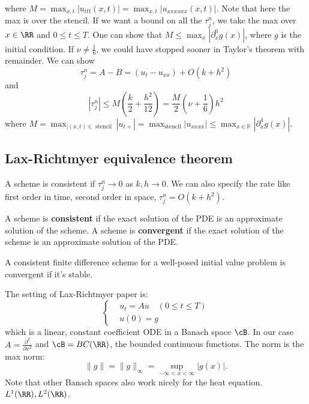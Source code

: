 where $M = \max_{x,t} |u_{ttt} (x,t)| = \max_{x,t} |u_{xxxxxx}(x,t)|$. Note that here the max is over the stencil. If we want a bound on all the $\tau_j^n$, we take the max over $x\in \RR$ and $0\le t\le T$. One can show that $M\le \max_x |\partial_x^6 g(x)|$, where $ g$ is the initial condition. If $\nu\neq \frac{1}{6}$, we could have stopped sooner in Taylor's theorem with remainder.  We can show 
\[
    \tau_j^n=A-B=\left(u_{t}-u_{x x}\right)+O\left(k+h^2\right) 
\]
and 
\[
    \left|\tau_j^n\right| \leq M\left(\frac{k}{2}+\frac{h^2}{12}\right)=\frac{M}{2}\left( \nu +\frac{1}{6}\right) h^2
\]
where $ M=\max _{|(x, t) \in \operatorname{stencil}}\left|u_{t+}\right|=\max _{\operatorname{stencil}}\left|u_{x x x x}\right| \leq \max _{x \in \mathbb{R}}\left|\partial_x^4 g(x)\right| $.  


\subsection{Lax-Richtmyer equivalence theorem}
\begin{definition}
[Consistent]
\label{def: Consistent}
A scheme is consistent if $\tau_j^n\to 0$ as $k,h\to 0$. We can also specify the rate like first order in time, second order in space, $\tau_j^n = O(k+h^2)$. 
\end{definition}


\begin{note}
A scheme is \textbf{consistent} if the exact solution of the PDE is an approximate solution of the scheme.  A scheme is \textbf{convergent} if the exact solution of the scheme is an approximate solution of the PDE. 
\end{note}


\begin{theorem}
\label{thm: Lax-Richtmyer equation}
A consistent finite difference scheme for a well-posed initial value problem is convergent if it's stable. 
\end{theorem}
The setting of Lax-Richtmyer paper is: 
\[
    \begin{cases}
            & u_t=A u \quad(0 \leqslant t \leqslant T) \\
            & u(0)=g
    \end{cases}
\]
which is a linear, constant coefficient ODE in a Banach space $\cB$.  In our case $A = \frac{\partial^2}{\partial x^2}$ and $\cB = BC(\RR)$, the bounded continuous functions. The norm is the max norm: 
\[
    \|g\| = \|g\|_\infty = \sup_{-\infty<x<\infty} |g(x)|. 
\] 
Note that other Banach spaces also work nicely for the heat equation. $L^1(\RR), L^2(\RR)$. 

